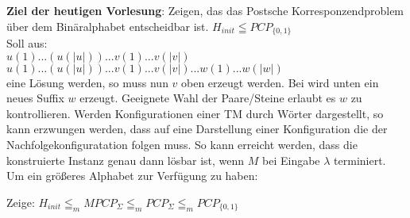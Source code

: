 
\textbf{Ziel der heutigen Vorlesung}: Zeigen, das das Postsche Korresponzendproblem über dem Binäralphabet entscheidbar ist. 
$H_{init} \leqq PCP_{\{0,1\}}$ \\

Soll aus: \\
$u(1)...(u(|u|))...v(1)...v(|v|)$ \\
$u(1)...(u(|u|))...v(1)...v(|v|)...w(1)...w(|w|)$ \\

eine Lösung werden, so muss nun $v$ oben erzeugt werden. Bei wird unten ein neues Suffix $w$ erzeugt.
Geeignete Wahl der Paare/Steine erlaubt es $w$ zu kontrollieren. Werden Konfigurationen einer TM durch Wörter
dargestellt, so kann erzwungen werden, dass auf eine Darstellung einer Konfiguration die der Nachfolgekonfiguratation
folgen muss. So kann erreicht werden, dass die konstruierte Instanz genau dann lösbar ist, wenn $M$
bei Eingabe $\lambda$ terminiert. \\

Um ein größeres Alphabet zur Verfügung zu haben:

Zeige: $H_{init} \leqq_m MPCP_\Sigma \leqq_m PCP_\Sigma \leqq_m PCP_{\{0,1\}}$

